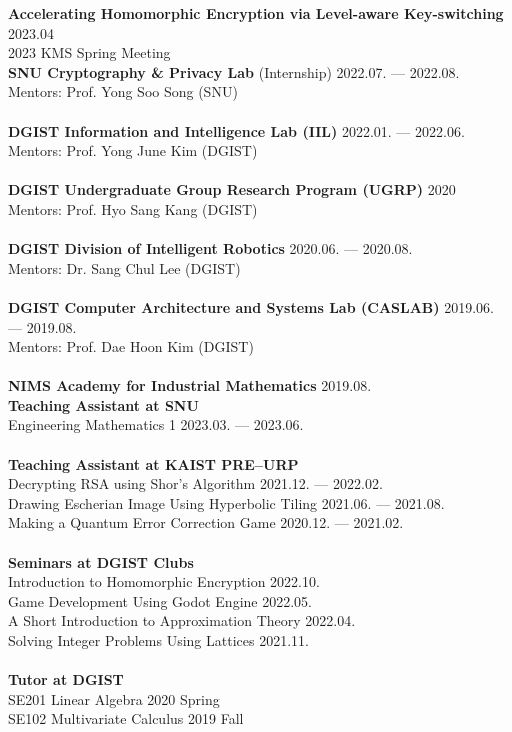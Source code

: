 \documentclass[a4paper, 11pt]{article}
\begin{document}
\textbf{Accelerating Homomorphic Encryption via Level-aware Key-switching} \hfill 2023.04 \\
2023 KMS Spring Meeting \\

\textbf{SNU Cryptography \& Privacy Lab} (Internship) \hfill 2022.07. --- 2022.08. \\
Mentors: Prof. Yong Soo Song (SNU) \\
\\
\textbf{DGIST Information and Intelligence Lab (IIL)}  \hfill 2022.01. --- 2022.06. \\
Mentors: Prof. Yong June Kim (DGIST) \\
\\
\textbf{DGIST Undergraduate Group Research Program (UGRP)}  \hfill 2020\\
Mentors: Prof. Hyo Sang Kang (DGIST) \\
\\
\textbf{DGIST Division of Intelligent Robotics} \hfill 2020.06. --- 2020.08. \\
Mentors: Dr. Sang Chul Lee (DGIST) \\
\\
\textbf{DGIST Computer Architecture and Systems Lab (CASLAB)} \hfill 2019.06. --- 2019.08. \\
Mentors: Prof. Dae Hoon Kim (DGIST)  \\
\\
\textbf{NIMS Academy for Industrial Mathematics} \hfill 2019.08. \\

\textbf{Teaching Assistant at SNU} \\
Engineering Mathematics 1 \hfill 2023.03. --- 2023.06. \\
\\
\textbf{Teaching Assistant at KAIST PRE--URP} \\
Decrypting RSA using Shor's Algorithm \hfill 2021.12. --- 2022.02. \\
Drawing Escherian Image Using Hyperbolic Tiling \hfill 2021.06. --- 2021.08. \\
Making a Quantum Error Correction Game \hfill 2020.12. --- 2021.02. \\
\\
\textbf{Seminars at DGIST Clubs} \\
Introduction to Homomorphic Encryption \hfill 2022.10. \\
Game Development Using Godot Engine \hfill 2022.05. \\
A Short Introduction to Approximation Theory \hfill 2022.04. \\
Solving Integer Problems Using Lattices \hfill 2021.11. \\
\\
\textbf{Tutor at DGIST} \\
SE201 Linear Algebra \hfill 2020 Spring \\
SE102 Multivariate Calculus \hfill 2019 Fall \\
\end{document}
